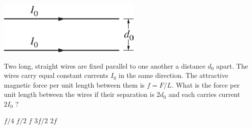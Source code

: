 \begin{center}
\includegraphics[scale=0.5]{images/img-005-015.png}
\end{center}

\begin{questions}\setcounter{question}{16}\question
Two long, straight wires are fixed parallel to one another a distance $d_{0}$ apart. The wires carry equal constant currents $I_{0}$ in the same direction. The attractive magnetic force per unit length between them is $f=F / L$. What is the force per unit length between the wires if their separation is $2 d_{0}$ and each carries current $2 I_{0}$ ?

\begin{oneparchoices}
\choice $f / 4$
\choice $f / 2$
\choice $f$
\choice $3 f / 2$
\choice $2 f$
\end{oneparchoices}\end{questions}


